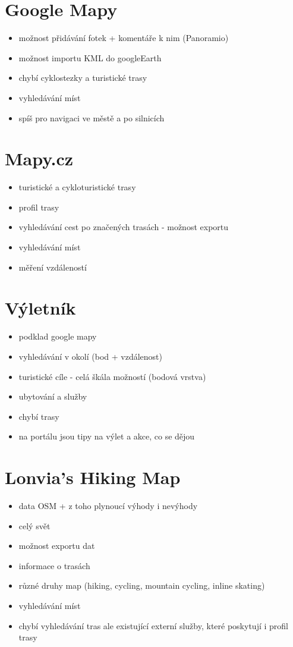 \documentclass[11pt,a4paper,titlepage,oneside]{book}
\begin{document}
	\section{Google Mapy}
		\begin{itemize}
			\item možnost přidávání fotek + komentáře k nim (Panoramio)
			\item možnost importu KML do googleEarth
			\item chybí cyklostezky a turistické trasy
			\item vyhledávání míst
			\item spíš pro navigaci ve městě a po silnicích
		\end{itemize}

	\section{Mapy.cz}
		\begin{itemize}
			\item turistické a cykloturistické trasy
			\item profil trasy
			\item vyhledávání cest po značených trasách - možnost exportu
			\item vyhledávání míst
			\item měření vzdáleností
		\end{itemize}

	\section{Výletník}
		\begin{itemize}
			\item podklad google mapy
			\item vyhledávání v okolí (bod + vzdálenost)
			\item turistické cíle - celá škála možností (bodová vrstva)
			\item ubytování a služby
			\item chybí trasy
			\item na portálu jsou tipy na výlet a akce, co se dějou
		\end{itemize}
	
	\section{Lonvia's Hiking Map}
		\begin{itemize}
			\item data OSM + z toho plynoucí výhody i nevýhody
			\item celý svět
			\item možnost exportu dat
			\item informace o trasách
			\item různé druhy map (hiking, cycling, mountain cycling, inline skating)
			\item vyhledávání míst
			\item chybí vyhledávání tras ale existující externí služby, které poskytují i profil trasy
		\end{itemize}
 
\end{document}
